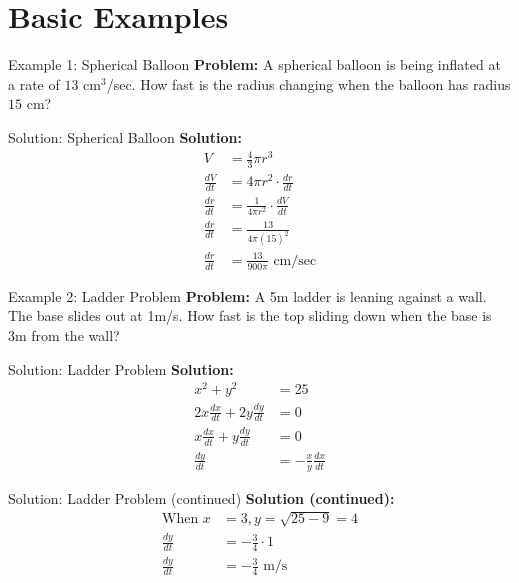 \documentclass[aspectratio=169]{beamer}
\begin{document}
\section{Basic Examples}

\begin{frame}{Example 1: Spherical Balloon}
\textbf{Problem:} A spherical balloon is being inflated at a rate of $13$ cm$^3$/sec. How fast is the radius changing when the balloon has radius $15$ cm?
\end{frame}

\begin{frame}{Solution: Spherical Balloon}
\textbf{Solution:}
\[
\begin{aligned}
  V &= \frac{4}{3}\pi r^3 \\
  \frac{dV}{dt} &= 4\pi r^2 \cdot \frac{dr}{dt} \\
  \frac{dr}{dt} &= \frac{1}{4\pi r^2} \cdot \frac{dV}{dt} \\
  \frac{dr}{dt} &= \frac{13}{4\pi (15)^2} \\
  \frac{dr}{dt} &= \frac{13}{900\pi} \text{ cm/sec}
\end{aligned}
\]
\end{frame}

\begin{frame}{Example 2: Ladder Problem}
\textbf{Problem:} A 5m ladder is leaning against a wall. The base slides out at 1m/s. How fast is the top sliding down when the base is 3m from the wall?
\end{frame}

\begin{frame}{Solution: Ladder Problem}
\textbf{Solution:}
\[
\begin{aligned}
  x^2 + y^2 &= 25 \\
  2x\frac{dx}{dt} + 2y\frac{dy}{dt} &= 0 \\
  x\frac{dx}{dt} + y\frac{dy}{dt} &= 0 \\
  \frac{dy}{dt} &= -\frac{x}{y}\frac{dx}{dt}
\end{aligned}
\]
\end{frame}

\begin{frame}{Solution: Ladder Problem (continued)}
\textbf{Solution (continued):}
\[
\begin{aligned}
  \text{When } x &= 3, y = \sqrt{25 - 9} = 4 \\
  \frac{dy}{dt} &= -\frac{3}{4} \cdot 1 \\
  \frac{dy}{dt} &= -\frac{3}{4} \text{ m/s}
\end{aligned}
\]
\end{frame}
\end{document}
